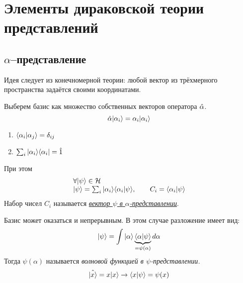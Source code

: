\section{Элементы дираковской теории представлений}
\subsection{$\alpha$--представление}
\Rem Идея следует из конечномерной теории: любой вектор из трёхмерного пространства задаётся своими координатами.

Выберем базис как множество собственных векторов оператора $\Hat \alpha$.
$$
    \Hat \alpha | \alpha_i \rangle = \alpha_i | \alpha_i \rangle
$$
\begin{enumerate}
  \item $\langle \alpha_i | \alpha_j \rangle = \delta_{ij}$
  \item $\sum_{i} | \alpha_i \rangle \langle \alpha_i | = \hat 1$
\end{enumerate}
При этом
$$
    \begin{array}{l}
      \forall | \psi \rangle \in \mathcal H\\
      | \psi \rangle = \sum_i | \alpha_i \rangle \langle \alpha_i | \psi \rangle, \qquad C_i  = \langle \alpha_i | \psi \rangle
    \end{array}
$$
\Def Набор чисел $C_i$ называется \underline{\emph{вектор $\psi$ в $\alpha$-представлении}}.

Базис может оказаться и непрерывным. В этом случае разложение имеет вид:
$$
   | \psi \rangle = \int | \alpha \rangle \underbrace{\langle \alpha | \psi \rangle}_{ = \psi(\alpha)}  d \alpha
$$
Тогда $\psi(\alpha)$ называется \emph{волновой функцией в $\psi$-представлении.}
$$
    \Hat{| x \rangle} = x | x \rangle \to \langle x | \psi \rangle = \psi(x)
$$

